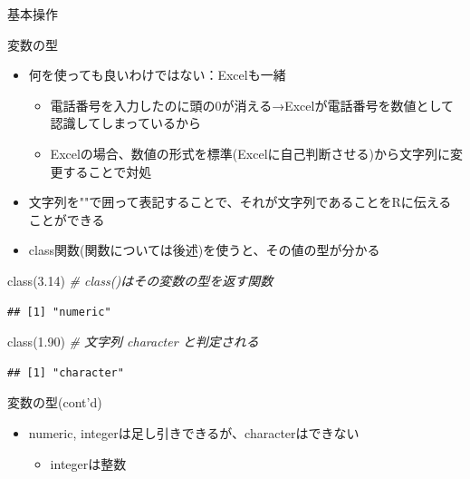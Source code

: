 \documentclass[
  ignorenonframetext,
]{beamer}
\newenvironment{Shaded}{\begin{snugshade}}{\end{snugshade}}
\newcommand{\CommentTok}[1]{\textcolor[rgb]{0.56,0.35,0.01}{\textit{#1}}}
\newcommand{\FloatTok}[1]{\textcolor[rgb]{0.00,0.00,0.81}{#1}}
\newcommand{\FunctionTok}[1]{\textcolor[rgb]{0.00,0.00,0.00}{#1}}
\newcommand{\NormalTok}[1]{#1}
\newcommand{\StringTok}[1]{\textcolor[rgb]{0.31,0.60,0.02}{#1}}
\providecommand{\tightlist}{%
  \setlength{\itemsep}{0pt}\setlength{\parskip}{0pt}}
\begin{document}
\begin{frame}[fragile]{基本操作}
\begin{block}{変数の型}
\begin{itemize}
  \begin{itemize}
  \tightlist
  \item
    何を使っても良いわけではない：Excelも一緒

    \begin{itemize}
    \tightlist
    \item
      電話番号を入力したのに頭の0が消える→Excelが電話番号を数値として認識してしまっているから
    \item
      Excelの場合、数値の形式を標準(Excelに自己判断させる)から文字列に変更することで対処
    \end{itemize}
  \item
    文字列を""で囲って表記することで、それが文字列であることをRに伝えることができる
  \item
    class関数(関数については後述)を使うと、その値の型が分かる
  \end{itemize}
\end{itemize}

\begin{Shaded}
\begin{Highlighting}[]
\FunctionTok{class}\NormalTok{(}\FloatTok{3.14}\NormalTok{) }\CommentTok{\# class()はその変数の型を返す関数}
\end{Highlighting}
\end{Shaded}

\begin{verbatim}
## [1] "numeric"
\end{verbatim}

\begin{Shaded}
\begin{Highlighting}[]
\FunctionTok{class}\NormalTok{(}\StringTok{\textquotesingle{}1.90\textquotesingle{}}\NormalTok{) }\CommentTok{\# 文字列 character と判定される}
\end{Highlighting}
\end{Shaded}

\begin{verbatim}
## [1] "character"
\end{verbatim}
\end{block}

\begin{block}{変数の型(cont'd)}
\protect\hypertarget{ux5909ux6570ux306eux578bcontd}{}
\begin{itemize}
\tightlist
\item
  numeric, integerは足し引きできるが、characterはできない

  \begin{itemize}
  \tightlist
  \item
    integerは整数
  \end{itemize}
\end{itemize}


\end{block}
\end{frame}
\end{document}
